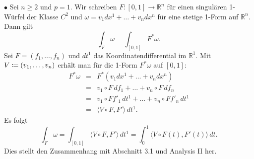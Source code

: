 \documentclass[a4paper,twoside,DIV15,BCOR12mm]{scrbook}
\begin{document}
\bigskip

 $\bullet$ Sei $n \ge 2$ und $p = 1$. Wir schreiben 
$F: [0,1] \to {\mathbb R}^{n}$ für einen singulären 1-Würfel der 
Klasse $C^{2}$ und $\omega = v_{1}dx^{1} + \dots + v_{n}dx^{n}$ für 
eine stetige 1-Form auf ${\mathbb R}^{n}$. Dann gilt
\[ \int_{F} \omega = \int_{[0,1]} F^{*}\omega. \]
Sei $F = (f_{1},\dots,f_{n})$ und $dt^{1}$ das Koordinatendifferential 
im ${\mathbb R}^{1}$. Mit $V \da  (v_{1},\dots,v_{n})$ erhält man für 
die 1-Form $F^{*}\omega$ auf $[0,1]$:
\begin{eqnarray*}
F^{*}\omega & = & F^{*}(v_{1}dx^{1} + \dots + v_{n}dx^{n}) \\
& = & v_{1} \circ F \, df_{1} + \dots + v_{n} \circ F\, df_{n} \\
& = & v_{1} \circ F f'_{1} \, dt^{1} + \dots + v_{n} \circ F f'_{n}\, 
dt^{1} \\
& = & \langle V \circ F, F' \rangle \, dt^{1}.
\end{eqnarray*}
Es folgt
\[ \int_{F} \omega = \int_{[0,1]} \langle V \circ F, F' \rangle \, 
dt^{1} = \int_{0}^{1} \langle V \circ F(t), F'(t) \rangle \, dt .\]
Dies stellt den Zusammenhang mit Abschnitt 3.1 und Analysis II her.\\
\end{document}
